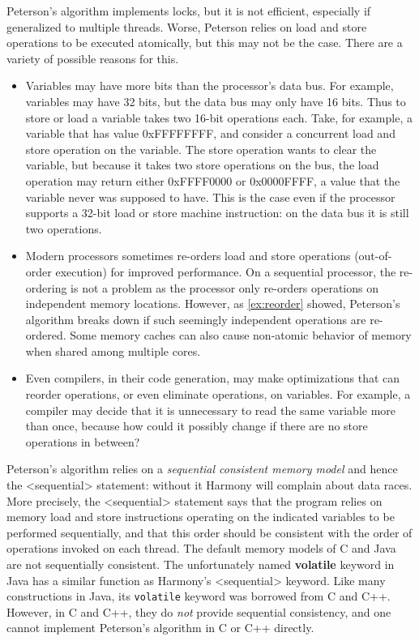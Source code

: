 \documentclass{report}
\begin{document}
Peterson's algorithm implements locks, but it is not efficient,
especially if generalized to multiple threads.
Worse, Peterson relies on load and store operations to be executed
atomically, but this may not be the case.
There are a variety of possible reasons for this.

\begin{itemize}
\item Variables may have more bits than the processor's data bus.
For example, variables may have 32 bits, but the data bus may only
have 16 bits.  Thus to store or load a variable takes two 16-bit
operations each.  Take, for example, a variable that has value
0xFFFFFFFF, and consider a concurrent load and store operation on
the variable.
The store operation wants to clear the variable, but because it
takes two store operations on the bus, the load operation may
return either 0xFFFF0000 or 0x0000FFFF, a value that the variable
never was supposed to have.
This is the case even if the processor supports a 32-bit load or
store machine instruction: on the data bus it is still two
operations.
\item Modern processors sometimes re-orders load and store operations
(out-of-order execution) for improved performance.  On a sequential processor,
the re-ordering is not a problem as the processor only re-orders
operations on independent memory locations.  However, as \autoref{ex:reorder}
showed, Peterson's algorithm breaks down if such seemingly independent
operations are re-ordered.
Some memory caches can also cause non-atomic behavior of memory when shared
among multiple cores.
\item Even compilers, in their code generation, may make optimizations
that can reorder operations, or even eliminate operations, on variables.
For example, a compiler may decide that it is unnecessary to read the same
variable more than once, because how could it possibly change if there
are no store operations in between?
\end{itemize}

Peterson's algorithm relies on a \emph{sequential consistent memory model}
and hence the <{sequential}> statement: without it Harmony will
complain about data races.
More precisely, the <{sequential}> statement says that the
program relies on memory load and store instructions operating on
the indicated variables to be performed sequentially, and that this
order should be consistent with the order of operations invoked on each
thread.
The default memory models of C and Java are not sequentially
consistent.
The unfortunately named \textbf{volatile} keyword in Java has
a similar function as Harmony's <{sequential}> keyword.
Like many constructions in Java, its \texttt{volatile} keyword
was borrowed from C and C++.
However, in C and C++, they do \emph{not} provide sequential
consistency, and one cannot implement Peterson's algorithm in
C or C++ directly.
\end{document}
